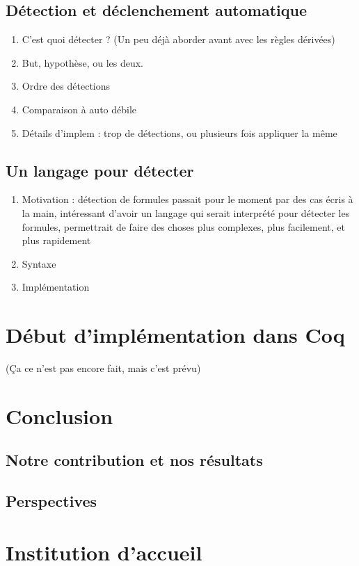 \documentclass[titlepage,draft]{article}
\begin{document}
\subsection{Détection et déclenchement automatique}
\begin{enumerate}
    \item C'est quoi détecter ? (Un peu déjà aborder avant avec les règles dérivées)
    \item But, hypothèse, ou les deux.
    \item Ordre des détections
    \item Comparaison à auto débile
    \item Détails d'implem : trop de détections, ou plusieurs fois appliquer la même
\end{enumerate}

\subsection{Un langage pour détecter}
\begin{enumerate}
    \item Motivation : détection de formules passait pour le moment par des cas écris à la main, intéressant d'avoir un langage qui serait interprété pour détecter les formules, permettrait de faire des choses plus complexes, plus facilement, et plus rapidement
    \item Syntaxe
    \item Implémentation
\end{enumerate}

\section{Début d'implémentation dans Coq} \label{Implémentation}
(Ça ce n'est pas encore fait, mais c'est prévu)

\section{Conclusion}
\subsection{Notre contribution et nos résultats}
\subsection{Perspectives}

\newpage
\appendix
\section{Institution d'accueil}
\end{document}
